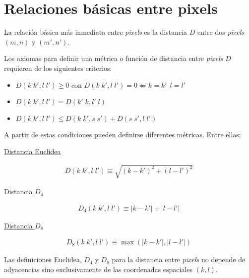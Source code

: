 \section{Relaciones b\'asicas entre pixels}

La relaci\'on b\'asica m\'as inmediata entre \textit{pixels} es la distancia $D$ entre dos \textit{pixels} $(m, n)$ y $(m', n')$.
%

Los axiomas para definir una m\'etrica o funci\'on de distancia entre \textit{pixels} $D$ requieren de los siguientes criterios:

\begin{itemize}
 \item $D(k \; k', l \; l') \geq 0$ con $D(k \; k', l \; l') = 0 \Leftrightarrow k=k' \, \; l=l'$
 \item $D(k \; k', l \; l') = D(k' \; k, l' \; l)$
 \item $D(k \; k', l \; l') \leq D(k \; k', s \; s') + D(s \; s', l \; l')$
\end{itemize}

A partir de estas condiciones pueden definirse diferentes m\'etricas. Entre ellas:

\begin{center}
 \underline{Distancia Euclidea}


\begin{eqnarray}
	D(k \; k', l \; l') \equiv \sqrt{\left( k - k' \right)^2 + \left( l - l' \right)^2}
\label{EqXXXIII}
\end{eqnarray}

 \underline{Distancia $D_{4}$}


\begin{eqnarray}
	D_{4}(k \; k', l \; l') \equiv \lvert k - k' \rvert + \lvert l - l' \rvert
\label{EqXXXIV}
\end{eqnarray}

 \underline{Distancia $D_{8}$}


\begin{eqnarray}
	D_{8}(k \; k', l \; l') \equiv \max \left( \lvert k - k' \rvert , \lvert l - l' \rvert \right)
\label{EqXXXIV}
\end{eqnarray}

\end{center}

Las definiciones Euclidea, $D_{4}$ y $D_{8}$ para la distancia entre \textit{pixels} no depende de adyacencias sino exclusivamente de las coordenadas 
espaciales $(k, l)$.
%


